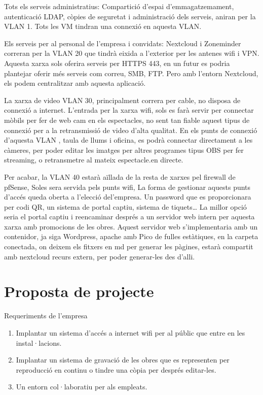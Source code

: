 \documentclass[
  10pt,
]{krantz}
\providecommand{\tightlist}{%
  \setlength{\itemsep}{0pt}\setlength{\parskip}{0pt}}
\begin{document}
Tots els serveis administratius: Compartició d'espai d'emmagatzemament, autenticació LDAP, còpies de seguretat i administració dels serveis, aniran per la VLAN 1. Tots les VM tindran una connexió en aquesta VLAN.

Els serveis per al personal de l'empresa i convidats: Nextcloud i Zoneminder correran per la VLAN 20 que tindrà eixida a l'exterior per les antenes wifi i VPN. Aquesta xarxa sols oferira serveis per HTTPS 443, en un futur es podria plantejar oferir més serveis com correu, SMB, FTP. Pero amb l'entorn Nextcloud, els podem centralitzar amb aquesta aplicació.

La xarxa de video VLAN 30, principalment correra per cable, no disposa de connexió a internet. L'entrada per la xarxa wifi, sols es farà servir per connectar mòbils per fer de web cam en els espectacles, no sent tan fiable aquest tipus de connexió per a la retransmissió de video d'alta qualitat. En els punts de connexió d'aquesta VLAN , taula de llums i oficina, es podrà connectar directament a les càmeres, per poder editar les imatges per altres programes tipus OBS per fer streaming, o retransmetre al mateix espectacle.en directe.

Per acabar, la VLAN 40 estarà aïllada de la resta de xarxes pel firewall de pfSense, Soles sera servida pels punts wifi, La forma de gestionar aquests punts d'accés queda oberta a l'elecció del'empresa. Un password que es proporcionara per codi QR, un sistema de portal captiu, sistema de tiquets\ldots{} La millor opció seria el portal captiu i reencaminar després a un servidor web intern per aquesta xarxa amb promocions de les obres. Aquest servidor web s'implementaria amb un contenidor, ja siga Wordpress, apache amb Pico de fulles estàtiques, en la carpeta conectada, on deixem els fitxers en md per generar les pàgines, estarà compartit amb nextcloud recurs extern, per poder generar-les des d'alli.

\hypertarget{proposta-de-projecte}{%
\chapter{Proposta de projecte}\label{proposta-de-projecte}}

Requeriments de l'empresa

\begin{enumerate}
\def\labelenumi{\arabic{enumi}.}
\tightlist
\item
  Implantar un sistema d'accés a internet wifi per al públic que entre en les instal·lacions.
\item
  Implantar un sistema de gravació de les obres que es representen per reproducció en continu o tindre una còpia per després editar-les.
\item
  Un entorn col·laboratiu per als empleats.
\end{enumerate}
\end{document}
